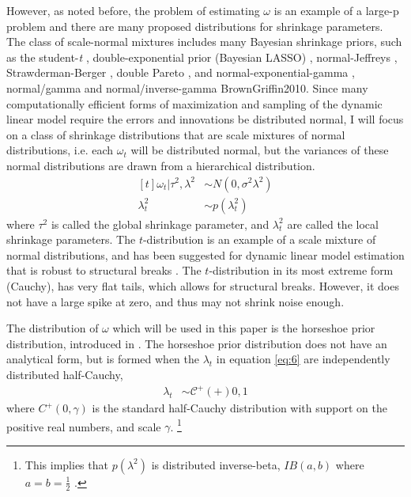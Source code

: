 \documentclass{article}
\newcommand{\paren}[1]{\ensuremath{\left(#1\right)}}
\newcommand{\dhalfcauchy}[1]{\ensuremath{\mathcal{C}^{+}\paren{#1}}}
\begin{document}
However, as noted before, the problem of estimating $\omega$ is an example of a large-p problem and there are many proposed distributions for shrinkage parameters.
The class of scale-normal mixtures includes many Bayesian shrinkage priors, such as the student-\textit{t} \parencite{Tipping2001}, double-exponential prior (Bayesian LASSO) \parencites{LiGoel2006}{ParkCasella2008}{Hans2009}, normal-Jeffreys \parencites{FigueiredoMember2003}{BaeMallick2004}, Strawderman-Berger \parencites{Strawderman1971}{Berger1980}, double Pareto \parencite{ArmaganDunsonLee2011},  and normal-exponential-gamma \parencite{BrownGriffin2005}, normal/gamma and normal/inverse-gamma \parencite{CaronDoucet2008}{BrownGriffin2010}.
Since many computationally efficient forms of maximization and sampling of the dynamic linear model require the errors and innovations be distributed normal, I will focus on a class of shrinkage distributions that are scale mixtures of normal distributions, i.e. each $\omega_{t}$ will be distributed normal, but the variances of these normal distributions are drawn from a hierarchical distribution.
\begin{equation}
  \label{eq:6}
  \begin{aligned}[t]
    \omega_{t} | \tau^{2}, \lambda^{2} & \sim N(0, \sigma^{2} \lambda^{2}) \\
    \lambda_{t}^{2} & \sim p(\lambda^{2}_{t})
  \end{aligned}
\end{equation}
where $\tau^{2}$ is called the global shrinkage parameter, and $\lambda_{t}^{2}$ are called the local shrinkage parameters.
The $t$-distribution is an example of a scale mixture of normal distributions, and has been suggested for dynamic linear model estimation that is robust to structural breaks \parencites{HarveyKoopman2000}{PetrisPetroneEtAl2009}.
The $t$-distribution in its most extreme form (Cauchy), has very flat tails, which allows for structural breaks.
However, it does not have a large spike at zero, and thus may not shrink noise enough.

The distribution of $\omega$ which will be used in this paper is the horseshoe prior distribution, introduced in \textcites{CarvalhoPolsonScott2009}{CarvalhoPolsonScott2010}.
The horseshoe prior distribution does not have an analytical form, but is formed when the $\lambda_{t}$ in equation \eqref{eq:6} are independently distributed half-Cauchy,
\begin{align}
  \label{eq:13}
  \lambda_{t} &\sim \dhalfcauchy{+}{0, 1}
\end{align}
where $C^{+}(0, \gamma)$ is the standard half-Cauchy distribution with support on the positive real numbers, and scale $\gamma$.%
\footnote{
  This implies that $p(\lambda^{2})$ is distributed inverse-beta, $IB(a, b)$ where $a = b = \frac{1}{2}$ \parencite[4]{PolsonScott2010}. 
}
\end{document}
